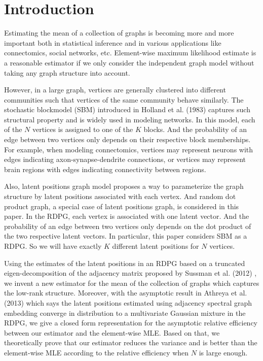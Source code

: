 \section{Introduction}

Estimating the mean of a collection of graphs is becoming more and more important both in statistical inference and in various applications like connectomics, social networks, etc.
Element-wise maximum likelihood estimate is a reasonable estimator if we only consider the independent graph model without taking any graph structure into account.

However, in a large graph, vertices are generally clustered into different communities such that vertices of the same community behave similarly. The stochastic blockmodel (SBM) introduced in Holland et al. (1983) \cite{holland1983stochastic} captures such structural property and is widely used in modeling networks. In this model, each of the $N$ vertices is assigned to one of the $K$ blocks. And the probability of an edge between two vertices only depends on their respective block memberships.
For example, when modeling connectomics, vertices may represent neurons with edges indicating axon-synapse-dendrite connections, or vertices may represent brain regions with edges indicating connectivity between regions.

Also, latent positions graph model proposes a way to parameterize the graph structure by latent positions associated with each vertex. And random dot product graph, a special case of latent positions graph, is considered in this paper. In the RDPG, each vertex is associated with one latent vector. And the probability of an edge between two vertices only depends on the dot product of the two respective latent vectors.
In particular, this paper considers SBM as a RDPG. So we will have exactly $K$ different latent positions for $N$ vertices.

Using the estimates of the latent positions in an RDPG based on a truncated eigen-decomposition of the adjacency matrix proposed by Sussman et al. (2012) \cite{sussman2012consistent}, we invent a new estimator for the mean of the collection of graphs which captures the low-rank structure. Moreover, with the asymptotic result in Athreya et al. (2013) \cite{athreya2013limit} which says the latent positions estimated using adjacency spectral graph embedding converge in distribution to a multivariate Gaussian mixture in the RDPG, we give a closed form representation for the asymptotic relative efficiency between our estimator and the element-wise MLE. Based on that, we theoretically prove that our estimator reduces the variance and is better than the element-wise MLE according to the relative efficiency when $N$ is large enough.


